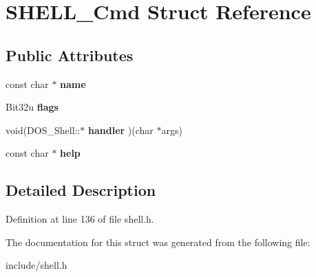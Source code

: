 \hypertarget{structSHELL__Cmd}{\section{S\-H\-E\-L\-L\-\_\-\-Cmd Struct Reference}
\label{structSHELL__Cmd}
}
\subsection*{Public Attributes}
\begin{DoxyCompactItemize}
\item 
\hypertarget{structSHELL__Cmd_a6c2bf878ebb62d9d05eed4e6228ff04b}{const char $\ast$ {\bfseries name}}\label{structSHELL__Cmd_a6c2bf878ebb62d9d05eed4e6228ff04b}

\item 
\hypertarget{structSHELL__Cmd_ae3518365a82721ce9f0b88ba409a36aa}{Bit32u {\bfseries flags}}\label{structSHELL__Cmd_ae3518365a82721ce9f0b88ba409a36aa}

\item 
\hypertarget{structSHELL__Cmd_a8ab69bb42cfd5dd8ca2cf15ce980ebf4}{void(D\-O\-S\-\_\-\-Shell\-::$\ast$ {\bfseries handler} )(char $\ast$args)}\label{structSHELL__Cmd_a8ab69bb42cfd5dd8ca2cf15ce980ebf4}

\item 
\hypertarget{structSHELL__Cmd_a3712fa3ab7cdfbbb384eee27e23b07f2}{const char $\ast$ {\bfseries help}}\label{structSHELL__Cmd_a3712fa3ab7cdfbbb384eee27e23b07f2}

\end{DoxyCompactItemize}


\subsection{Detailed Description}


Definition at line 136 of file shell.\-h.



The documentation for this struct was generated from the following file\-:\begin{DoxyCompactItemize}
\item 
include/shell.\-h\end{DoxyCompactItemize}
